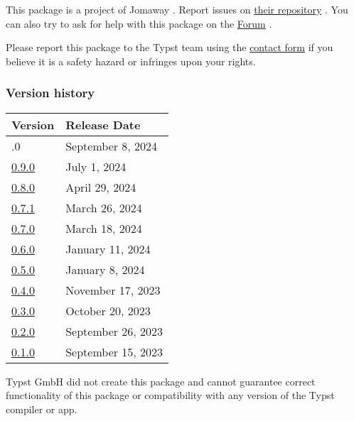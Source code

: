 This package is a project of Jomaway . Report issues on
\href{https://github.com/jomaway/typst-gentle-clues}{their repository} .
You can also try to ask for help with this package on the
\href{https://forum.typst.app}{Forum} .

Please report this package to the Typst team using the
\href{https://typst.app/contact}{contact form} if you believe it is a
safety hazard or infringes upon your rights.

\label{versions}
\subsubsection{Version history}\label{version-history}

\begin{longtable}[]{@{}ll@{}}
\toprule\noalign{}
Version & Release Date \\
\midrule\noalign{}
\endhead
\bottomrule\noalign{}
\endlastfoot
1.0.0 & September 8, 2024 \\
\href{https://typst.app/universe/package/gentle-clues/0.9.0/}{0.9.0} &
July 1, 2024 \\
\href{https://typst.app/universe/package/gentle-clues/0.8.0/}{0.8.0} &
April 29, 2024 \\
\href{https://typst.app/universe/package/gentle-clues/0.7.1/}{0.7.1} &
March 26, 2024 \\
\href{https://typst.app/universe/package/gentle-clues/0.7.0/}{0.7.0} &
March 18, 2024 \\
\href{https://typst.app/universe/package/gentle-clues/0.6.0/}{0.6.0} &
January 11, 2024 \\
\href{https://typst.app/universe/package/gentle-clues/0.5.0/}{0.5.0} &
January 8, 2024 \\
\href{https://typst.app/universe/package/gentle-clues/0.4.0/}{0.4.0} &
November 17, 2023 \\
\href{https://typst.app/universe/package/gentle-clues/0.3.0/}{0.3.0} &
October 20, 2023 \\
\href{https://typst.app/universe/package/gentle-clues/0.2.0/}{0.2.0} &
September 26, 2023 \\
\href{https://typst.app/universe/package/gentle-clues/0.1.0/}{0.1.0} &
September 15, 2023 \\
\end{longtable}

Typst GmbH did not create this package and cannot guarantee correct
functionality of this package or compatibility with any version of the
Typst compiler or app.
